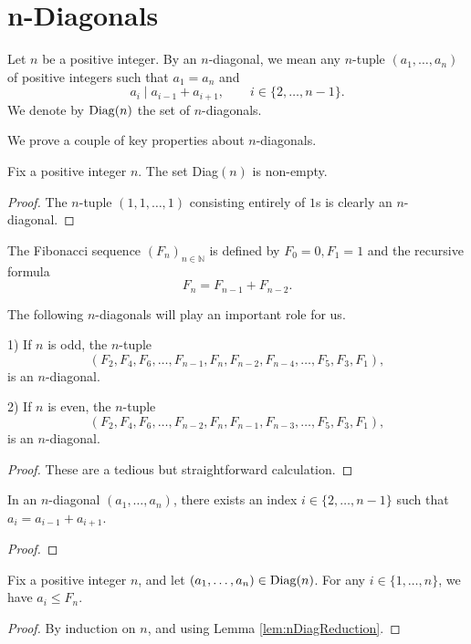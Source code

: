 
\chapter{n-Diagonals}
\begin{definition}
    \label{def:nDiag}
    Let $n$ be a positive integer. By an $n$-diagonal, we mean any $n$-tuple $(a_1,\ldots, a_n)$ of positive integers 
    such that $a_1 = a_n$ and 
    \[
        a_i \mid a_{i-1} + a_{i+1}, \qquad i \in \{2, \ldots, n-1\}.
    \]
    We denote by ${\rm Diag}(n)$ the set of $n$-diagonals.
\end{definition}

We prove a couple of key properties about $n$-diagonals. 
\begin{lemma}
    \label{l:nDiagNonEmpty}
    Fix a positive integer $n$. The set Diag$(n)$ is non-empty.
\end{lemma}
\begin{proof}
    The $n$-tuple $(1,1,\ldots, 1)$ consisting entirely of $1$s is clearly an $n$-diagonal.
\end{proof}

\begin{definition}
    \label{def:fib}
    The Fibonacci sequence $(F_n)_{n \in \mathbb{N}}$ is defined by $F_0 = 0, F_1 = 1$ and the recursive formula
    \[
        F_n = F_{n-1} + F_{n-2}.
    \]
\end{definition}

The following $n$-diagonals will play an important role for us.
\begin{lemma}
    \label{l:FibDiag}
    1) If $n$ is odd, the $n$-tuple 
    \[
        (F_2,F_4, F_6, \ldots, F_{n-1}, F_{n}, F_{n-2}, F_{n-4}, \ldots, F_5, F_3, F_1), 
    \]
    is an $n$-diagonal.

    2) If $n$ is even, the $n$-tuple 
    \[
        (F_2, F_4, F_6, \ldots, F_{n-2}, F_{n}, F_{n-1}, F_{n-3}, \ldots, F_5, F_3,F_1),
    \]
    is an $n$-diagonal. 
\end{lemma}
\begin{proof}
    These are a tedious but straightforward calculation.
\end{proof}

\begin{lemma}
    \label{lem:nDiagReduction}
    In an $n$-diagonal $(a_1, \ldots, a_n)$, there exists an index $i \in \{2,\ldots, n-1\}$ 
    such that $a_i = a_{i-1} + a_{i+1}$.
\end{lemma}
\begin{proof}

\end{proof}

\begin{proposition}
    \label{prop:nDiagBounded}
    Fix a positive integer $n$, and let $(a_1, \ldots, a_n) \in {\rm Diag}(n)$. 
    For any $i \in \{1,\ldots, n\}$, we have $a_i \leq F_n$. 
\end{proposition}
\begin{proof}
   By induction on $n$, and using Lemma \ref{lem:nDiagReduction}.
\end{proof}
